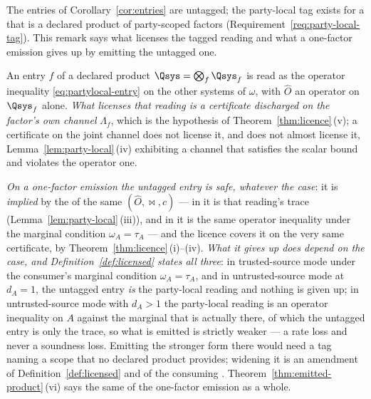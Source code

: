 
The entries of Corollary~\ref{cor:entries} are untagged; the party-local tag
exists for a  that is a declared product of party-scoped
factors (Requirement~\ref{req:party-local-tag}). This remark says what
licenses the tagged reading and what a one-factor emission gives up by
emitting the untagged one.

\begin{remark}\label{rem:entry-tags}
An entry  $f$ of a declared product
$\Qsys=\bigotimes_f\Qsys_f$ is read as the operator inequality
\eqref{eq:partylocal-entry} on the other systems of $\omega$, with $\hat O$
an operator on $\Qsys_f$ alone. \emph{What licenses that reading is a
certificate discharged on the factor's own channel} $\Lambda_f$, which is the
hypothesis of Theorem~\ref{thm:licence}\,(v); a certificate on the joint
channel does not license it, and does not almost license it,
Lemma~\ref{lem:party-local}\,(iv) exhibiting a channel that satisfies the
scalar bound and violates the operator one.

\emph{On a one-factor emission the untagged entry is safe, whatever the
case}: it is \emph{implied} by the
 of the same
$(\hat O,\bowtie,c)$ --- in
 it is that reading's trace
(Lemma~\ref{lem:party-local}\,(iii)), and in  it is
the same operator inequality under the marginal condition $\omega_A=\tau_A$
--- and the licence covers it on the very same certificate, by
Theorem~\ref{thm:licence}\,(i)--(iv). \emph{What it gives up does depend on
the case, and Definition~\ref{def:licensed} states all three}: in
trusted-source mode under the consumer's marginal condition
$\omega_A=\tau_A$, and in untrusted-source mode at $d_A=1$, the untagged entry
\emph{is} the party-local reading and nothing is given up; in untrusted-source
mode with $d_A>1$ the party-local reading is an operator inequality on $A$
against the marginal that is actually there, of which the untagged entry is
only the trace, so what is emitted is strictly weaker --- a rate loss and
never a soundness loss. Emitting the stronger form there would need a tag
naming a scope that no declared product provides; widening it is an amendment
of Definition~\ref{def:licensed} and of the consuming .
Theorem~\ref{thm:emitted-product}\,(vi) says the same of the one-factor
emission as a whole.
\end{remark}

